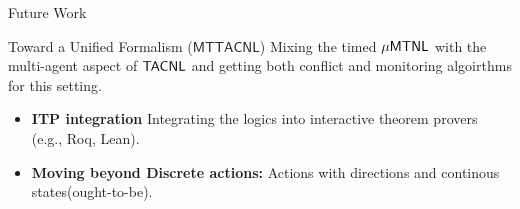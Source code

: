 \documentclass[9pt]{beamer}
\begin{document}
\begin{frame}{Future Work}
  \begin{block}{Toward a Unified Formalism ($\mathsf{MTTACNL}$)}
    Mixing the timed $\mathsf{\mu MTNL}$ with  the multi-agent aspect of $\mathsf{TACNL}$ and getting both conflict and monitoring algoirthms for this setting.
  \end{block}

  \begin{itemize}
    \item \textbf{ITP integration} Integrating the logics into interactive theorem provers (e.g., Roq, Lean).
    \item \textbf{Moving beyond Discrete actions:} Actions with directions and continous states(ought-to-be).
  \end{itemize}
\end{frame}
	
	
	
\end{document}
